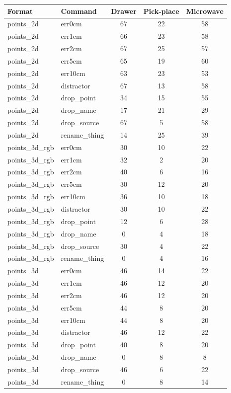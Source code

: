 \begin{tabular}{llccc}
\toprule
Format & Command & Drawer & Pick-place & Microwave \\
\midrule
points\_2d & err0cm & 67 & 22 & 58 \\
points\_2d & err1cm & 66 & 23 & 58 \\
points\_2d & err2cm & 67 & 25 & 57 \\
points\_2d & err5cm & 65 & 19 & 60 \\
points\_2d & err10cm & 63 & 23 & 53 \\
points\_2d & distractor & 67 & 13 & 58 \\
points\_2d & drop\_point & 34 & 15 & 55 \\
points\_2d & drop\_name & 17 & 21 & 29 \\
points\_2d & drop\_source & 67 & 5 & 58 \\
points\_2d & rename\_thing & 14 & 25 & 39 \\
points\_3d\_rgb & err0cm & 30 & 10 & 22 \\
points\_3d\_rgb & err1cm & 32 & 2 & 20 \\
points\_3d\_rgb & err2cm & 40 & 6 & 16 \\
points\_3d\_rgb & err5cm & 30 & 12 & 20 \\
points\_3d\_rgb & err10cm & 36 & 10 & 18 \\
points\_3d\_rgb & distractor & 30 & 10 & 22 \\
points\_3d\_rgb & drop\_point & 12 & 6 & 28 \\
points\_3d\_rgb & drop\_name & 0 & 4 & 18 \\
points\_3d\_rgb & drop\_source & 30 & 4 & 22 \\
points\_3d\_rgb & rename\_thing & 0 & 4 & 16 \\
points\_3d & err0cm & 46 & 14 & 22 \\
points\_3d & err1cm & 46 & 12 & 20 \\
points\_3d & err2cm & 46 & 12 & 20 \\
points\_3d & err5cm & 44 & 8 & 20 \\
points\_3d & err10cm & 44 & 8 & 20 \\
points\_3d & distractor & 46 & 12 & 22 \\
points\_3d & drop\_point & 40 & 8 & 20 \\
points\_3d & drop\_name & 0 & 8 & 8 \\
points\_3d & drop\_source & 46 & 6 & 22 \\
points\_3d & rename\_thing & 0 & 8 & 14 \\
\bottomrule
\end{tabular}
